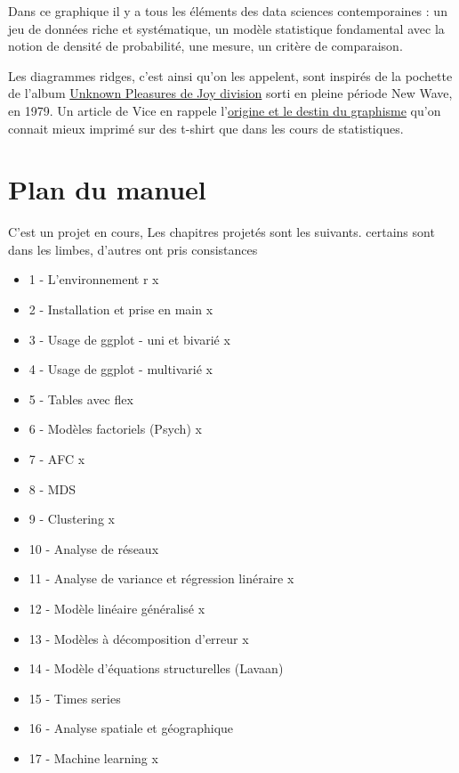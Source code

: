 \documentclass[
]{book}
\providecommand{\tightlist}{%
  \setlength{\itemsep}{0pt}\setlength{\parskip}{0pt}}
\begin{document}
Dans ce graphique il y a tous les éléments des data sciences contemporaines : un jeu de données riche et systématique, un modèle statistique fondamental avec la notion de densité de probabilité, une mesure, un critère de comparaison.

Les diagrammes ridges, c'est ainsi qu'on les appelent, sont inspirés de la pochette de l'album \href{https://www.youtube.com/watch?v=7PtvIr2oiaE}{Unknown Pleasures de Joy division} sorti en pleine période New Wave, en 1979. Un article de Vice en rappele l'\href{https://i-d.vice.com/fr/article/pabjam/pourquoi-cette-pochette-dalbum-de-joy-division-a-inspire-le-monde-entier}{origine et le destin du graphisme} qu'on connait mieux imprimé sur des t-shirt que dans les cours de statistiques.

\hypertarget{plan-du-manuel}{%
\section{Plan du manuel}\label{plan-du-manuel}}

C'est un projet en cours, Les chapitres projetés sont les suivants. certains sont dans les limbes, d'autres ont pris consistances

\begin{itemize}
\tightlist
\item
  1 - L'environnement r x
\item
  2 - Installation et prise en main x
\item
  3 - Usage de ggplot - uni et bivarié x
\item
  4 - Usage de ggplot - multivarié x
\item
  5 - Tables avec flex
\item
  6 - Modèles factoriels (Psych) x
\item
  7 - AFC x
\item
  8 - MDS\\
\item
  9 - Clustering x
\item
  10 - Analyse de réseaux
\item
  11 - Analyse de variance et régression linéraire x
\item
  12 - Modèle linéaire généralisé x
\item
  13 - Modèles à décomposition d'erreur x
\item
  14 - Modèle d'équations structurelles (Lavaan)
\item
  15 - Times series
\item
  16 - Analyse spatiale et géographique
\item
  17 - Machine learning x
\end{itemize}
\end{document}
